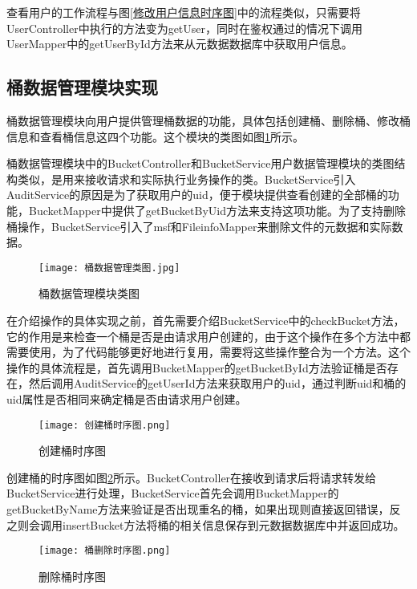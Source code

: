 查看用户的工作流程与图\ref{修改用户信息时序图}中的流程类似，只需要将UserController中执行的方法变为getUser，同时在鉴权通过的情况下调用UserMapper中的getUserById方法来从元数据数据库中获取用户信息。

\subsection{桶数据管理模块实现}

桶数据管理模块向用户提供管理桶数据的功能，具体包括创建桶、删除桶、修改桶信息和查看桶信息这四个功能。这个模块的类图如图\ref{桶数据管理模块类图}所示。

桶数据管理模块中的BucketController和BucketService用户数据管理模块的类图结构类似，是用来接收请求和实际执行业务操作的类。BucketService引入AuditService的原因是为了获取用户的uid，便于模块提供查看创建的全部桶的功能，BucketMapper中提供了getBucketByUid方法来支持这项功能。为了支持删除桶操作，BucketService引入了msf和FileinfoMapper来删除文件的元数据和实际数据。

\begin{figure}
  \centering
  \texttt{[image: 桶数据管理类图.jpg]}
  \caption{桶数据管理模块类图}
  \label{桶数据管理模块类图}
\end{figure}

在介绍操作的具体实现之前，首先需要介绍BucketService中的checkBucket方法，它的作用是来检查一个桶是否是由请求用户创建的，由于这个操作在多个方法中都需要使用，为了代码能够更好地进行复用，需要将这些操作整合为一个方法。这个操作的具体流程是，首先调用BucketMapper的getBucketById方法验证桶是否存在，然后调用AuditService的getUserId方法来获取用户的uid，通过判断uid和桶的uid属性是否相同来确定桶是否由请求用户创建。

\begin{figure}
  \centering
  \texttt{[image: 创建桶时序图.png]}
  \caption{创建桶时序图}
  \label{创建桶时序图}
\end{figure}

创建桶的时序图如图\ref{创建桶时序图}所示。BucketController在接收到请求后将请求转发给BucketService进行处理，BucketService首先会调用BucketMapper的getBucketByName方法来验证是否出现重名的桶，如果出现则直接返回错误，反之则会调用insertBucket方法将桶的相关信息保存到元数据数据库中并返回成功。

\begin{figure}
  \centering
  \texttt{[image: 桶删除时序图.png]}
  \caption{删除桶时序图}
  \label{删除桶时序图}
\end{figure}

